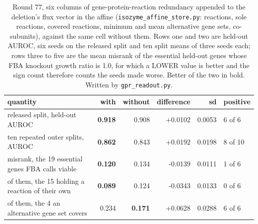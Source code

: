 \begin{table}[H]
  \centering
  \footnotesize
  \caption[Round 77: the gene-rule redundancy columns]{Round 77, six columns of gene-protein-reaction redundancy appended to the deletion's flux vector in the affine (\texttt{isozyme\_affine\_store.py}: reactions, sole reactions, covered reactions, minimum and mean alternative gene sets, co-subunits), against the same cell without them. Rows one and two are held-out AUROC, six seeds on the released split and ten split means of three seeds each; rows three to five are the mean misrank of the essential held-out genes whose FBA knockout growth ratio is 1.0, for which a LOWER value is better and the sign count therefore counts the seeds made worse. Better of the two in bold. Written by \texttt{gpr\_readout.py}.}
  \label{tab:gpr-readout}
  \begin{tabular}{@{}lrrrrl@{}}
    \hline
    quantity & with & without & difference & sd & positive \\
    \hline
    released split, held-out AUROC & \textbf{0.918} & 0.908 & +0.0102 & 0.0053 & 6 of 6 \\
    ten repeated outer splits, AUROC & \textbf{0.862} & 0.843 & +0.0192 & 0.0198 & 8 of 10 \\
    misrank, the 19 essential genes FBA calls viable & \textbf{0.120} & 0.134 & -0.0139 & 0.0111 & 1 of 6 \\
    of them, the 15 holding a reaction of their own & \textbf{0.089} & 0.124 & -0.0343 & 0.0133 & 0 of 6 \\
    of them, the 4 an alternative gene set covers & 0.234 & \textbf{0.171} & +0.0628 & 0.0288 & 6 of 6 \\
    \hline
  \end{tabular}
\end{table}
